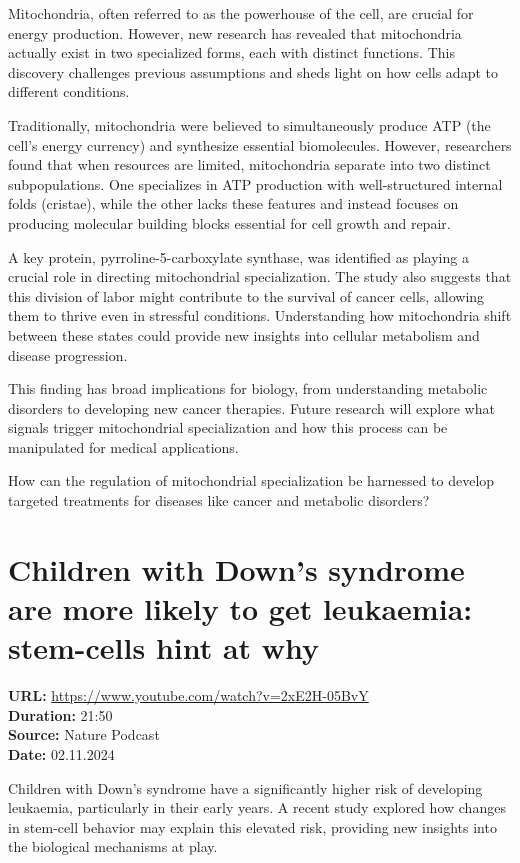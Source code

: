 \documentclass[12pt]{article}
\begin{document}
Mitochondria, often referred to as the powerhouse of the cell, are crucial for energy production. However, new research has revealed that mitochondria actually exist in two specialized forms, each with distinct functions. This discovery challenges previous assumptions and sheds light on how cells adapt to different conditions.


Traditionally, mitochondria were believed to simultaneously produce ATP (the cell’s energy currency) and synthesize essential biomolecules. However, researchers found that when resources are limited, mitochondria separate into two distinct subpopulations. One specializes in ATP production with well-structured internal folds (cristae), while the other lacks these features and instead focuses on producing molecular building blocks essential for cell growth and repair.

A key protein, pyrroline-5-carboxylate synthase, was identified as playing a crucial role in directing mitochondrial specialization. The study also suggests that this division of labor might contribute to the survival of cancer cells, allowing them to thrive even in stressful conditions. Understanding how mitochondria shift between these states could provide new insights into cellular metabolism and disease progression.


This finding has broad implications for biology, from understanding metabolic disorders to developing new cancer therapies. Future research will explore what signals trigger mitochondrial specialization and how this process can be manipulated for medical applications.

\vspace{.5cm}
How can the regulation of mitochondrial specialization be harnessed to develop targeted treatments for diseases like cancer and metabolic disorders?

\newpage

\section{Children with Down's syndrome are more likely to get leukaemia: stem-cells hint at why}
\textbf{URL:} \url{https://www.youtube.com/watch?v=2xE2H-05BvY}\\
\textbf{Duration:} 21:50\\
\textbf{Source:} Nature Podcast\\
\textbf{Date:} 02.11.2024



Children with Down’s syndrome have a significantly higher risk of developing leukaemia, particularly in their early years. A recent study explored how changes in stem-cell behavior may explain this elevated risk, providing new insights into the biological mechanisms at play.
\end{document}
